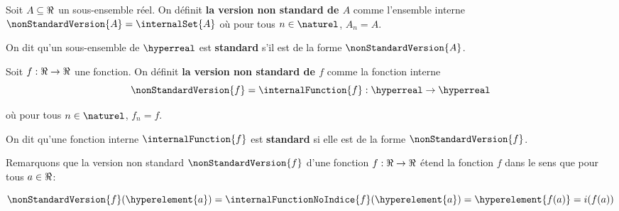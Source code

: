 \begin{definition}
	Soit $A \subseteq \real$ un sous-ensemble réel. On définit \textbf{la
	version non standard de $A$} comme l'ensemble interne $\nonStandardVersion{A} =
	\internalSet{A}$ où pour tous $n \in \naturel$, $A_{n} = A$.

	On dit qu'un sous-ensemble de $\hyperreal$ est \textbf{standard} s'il
	est de la forme $\nonStandardVersion{A}$.
\end{definition}

\begin{definition}
	Soit $f : \real \rightarrow \real$ une fonction. On définit \textbf{la
	version non standard de $f$} comme la fonction interne
	\begin{equation}
		\nonStandardVersion{f} = \internalFunction{f} : \hyperreal \rightarrow \hyperreal
	\end{equation}

	où pour tous $n \in \naturel$, $f_{n} = f$.

	On dit qu'une fonction interne $\internalFunction{f}$ est \textbf{standard}
	si elle est de la forme $\nonStandardVersion{f}$.
\end{definition}






Remarquons que la version non standard $\nonStandardVersion{f}$ d'une fonction $f :
\real \rightarrow \real$ étend la fonction $f$ dans le sens que pour tous $a \in
\real$:

\begin{equation}
	\nonStandardVersion{f}(\hyperelement{a}) =
	\internalFunctionNoIndice{f}(\hyperelement{a}) = \hyperelement{f(a)} = i(f(a))
\end{equation}

